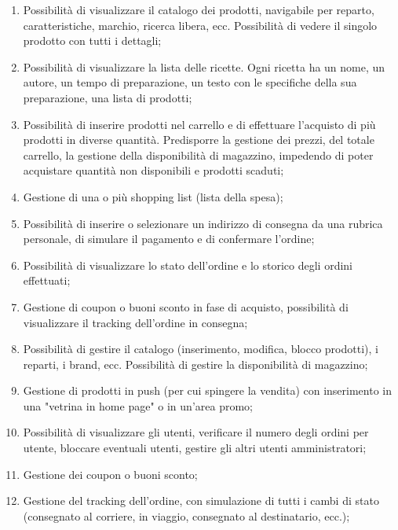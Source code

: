 \begin{enumerate}
	
	\item
	\label{f-up}
	Possibilità di visualizzare il catalogo dei prodotti, navigabile per reparto, caratteristiche, marchio, ricerca libera, ecc.
	Possibilità di vedere il singolo prodotto con tutti i dettagli;
	
	\item
	\label{ef-up}
	Possibilità di visualizzare la lista delle ricette. Ogni ricetta ha un nome, un autore, un tempo di preparazione, un testo con le specifiche della sua preparazione, una lista di prodotti;
	
	\item
	Possibilità di inserire prodotti nel carrello e di effettuare l'acquisto di più prodotti in diverse quantità.
	Predisporre la gestione dei prezzi, del totale carrello, la gestione della disponibilità di magazzino, impedendo di poter acquistare quantità non disponibili e prodotti scaduti;
	
	\item
	Gestione di una o più shopping list (lista della spesa);
	
	\item
	Possibilità di inserire o selezionare un indirizzo di consegna da una rubrica personale, di simulare il pagamento e di confermare l'ordine;
	
	\item
	Possibilità di visualizzare lo stato dell'ordine e lo storico degli ordini effettuati;
	
	\item
	\label{ef-ur}
	Gestione di coupon o buoni sconto in fase di acquisto, possibilità di visualizzare il tracking dell'ordine in consegna;
	
	\item
	\label{sf-ua}
	Possibilità di gestire il catalogo (inserimento, modifica, blocco prodotti), i reparti, i brand, ecc.
	Possibilità di gestire la disponibilità di magazzino;
	
	\item
	Gestione di prodotti in push (per cui spingere la vendita) con inserimento in una "vetrina in home page" o in un'area promo;
	
	\item
	Possibilità di visualizzare gli utenti, verificare il numero degli ordini per utente, bloccare eventuali utenti, gestire gli altri utenti amministratori;
	
	\item
	Gestione dei coupon o buoni sconto;
	
	\item
	\label{ef-ua}
	Gestione del tracking dell'ordine, con simulazione di tutti i cambi di stato (consegnato al corriere, in viaggio, consegnato al destinatario, ecc.);
	
\end{enumerate}

